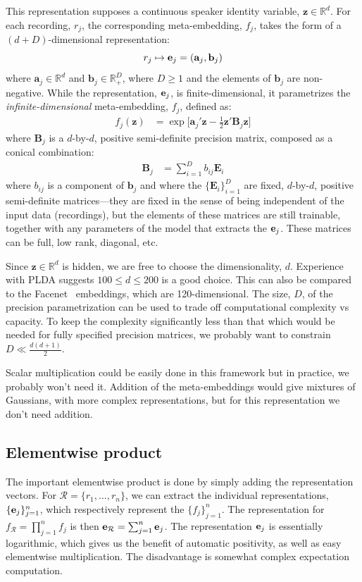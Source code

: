 \documentclass[a4paper,oneside,12pt,english]{report}
\def\zvec{\mathbf{z}}
\def\R{\mathbb{R}}
\def\Bmat{\mathbf{B}}
\def\Emat{\mathbf{E}}
\def\avec{\mathbf{a}}
\def\bvec{\mathbf{b}}
\def\Rset{\mathcal{R}}
\begin{document}
This representation supposes a continuous speaker identity variable, $\zvec\in\R^d$. For each recording, $r_j$, the corresponding meta-embedding, $f_j$, takes the form of a $(d+D)$-dimensional representation:
$$r_j\mapsto\evec_j=(\avec_j,\bvec_j)$$
where $\avec_j\in\R^d$ and $\bvec_j\in\R_+^D$, where $D\ge1$ and the elements of $\bvec_j$ are non-negative. While the representation, $\mathbf{e}_j$, is finite-dimensional, it parametrizes the \emph{infinite-dimensional} meta-embedding, $f_j$, defined as:
\begin{align}
\label{eq:gaussembed}
f_j(\zvec) &= \exp\bigl[\avec_j'\zvec -\frac12\zvec'\Bmat_j\zvec]
\end{align}
where $\Bmat_j$ is a $d$-by-$d$, positive semi-definite precision matrix, composed as a conical combination:
\begin{align}
\label{eq:Bmat}
\Bmat_j &= \sum_{i=1}^D b_{ij} \Emat_i
\end{align}
where $b_{ij}$ is a component of $\bvec_j$ and where the $\{\Emat_i\}_{i=1}^D$ are fixed, $d$-by-$d$, positive semi-definite matrices---they are fixed in the sense of being independent of the input data (recordings), but the elements of these matrices are still trainable, together with any parameters of the model that extracts the $\mathbf{e}_j$. These matrices can be full, low rank, diagonal, etc. 

Since $\zvec\in\R^d$ is hidden, we are free to choose the dimensionality, $d$. Experience with PLDA suggests $100\le d\le200$ is a good choice. This can also be compared to the Facenet~\cite{Facenet} embeddings, which are 120-dimensional. The size, $D$, of the precision parametrization can be used to trade off computational complexity vs capacity. To keep the complexity significantly less than that which would be needed for fully specified precision matrices, we probably want to constrain $D\ll\frac{d(d+1)}{2}$. 

Scalar multiplication could be easily done in this framework but in practice, we probably won't need it. Addition of the meta-embeddings would give mixtures of Gaussians, with more complex representations, but for this representation we don't need addition.

\subsection{Elementwise product}
The important elementwise product is done by simply adding the representation vectors. For $\Rset=\{r_1,\ldots,r_n\}$, we can extract the individual representations, $\{\mathbf{e}_j\}_{j=1}^n$, which respectively represent the $\{f_j\}_{j=1}^n$. The representation for $f_\Rset=\prod_{j=1}^n f_j$ is then $\evec_\Rset=\sum_{j=1}^n \evec_j$. The representation $\mathbf{e}_j$ is essentially logarithmic, which gives us the benefit of automatic positivity, as well as easy elementwise multiplication. The disadvantage is somewhat complex expectation computation.
\end{document}
